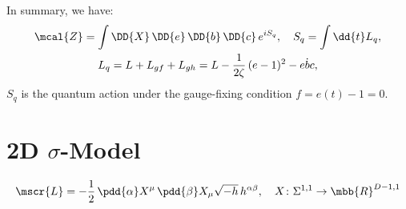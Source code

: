 \documentclass[a4paper,10pt]{article}
\begin{document}
\begin{itemize}
	In summary, we have:
	\begin{gather}
		\mcal{Z}
		= \int \DD{X}\,\DD{e}\,\DD{b}\,\DD{c}\,
			e^{iS_{q}},\quad
		S_q = \int \dd{t} L_q,\\
		L_q
		= L + L_{gf} + L_{gh}
		= L - \frac{1}{2\zeta} \,(e-1)^2
			- e\dot{b}c,
	\end{gather}
	$S_q$ is the quantum action under the gauge-fixing condition $f = e(t) - 1 = 0$. 
	\qedfull
	\end{itemize}
\section{2D $\sigma$-Model}
	\vspace{-.3\baselineskip}
	\begin{equation}
		\mscr{L}
		= -\frac{1}{2}\,
			\pdd{\alpha} X^\mu\,
			\pdd{\beta} X_\mu
			\sqrt{-h}\,h^{\alpha\beta},\quad
		X\colon \Sigma^{1,1}\to\mbb{R}^{D-1,1}
	\end{equation}
	
\end{document}
